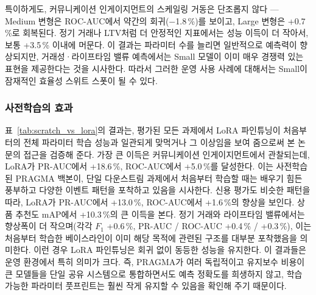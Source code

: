 특이하게도, 커뮤니케이션 인게이지먼트의 스케일링 거동은 단조롭지 않다 — Medium 변형은 ROC-AUC에서 약간의 회귀($-$1.8\,\%)를 보이고, Large 변형은 +0.7\,\%로 회복된다.
정기 거래나 LTV처럼 더 안정적인 지표에서는 성능 이득이 더 작아서, 보통 +3.5\,\% 이내에 머문다.
이 결과는 파라미터 수를 늘리면 일반적으로 예측력이 향상되지만, 거래성·라이프타임 밸류 예측에서는 Small 모델이 이미 매우 경쟁력 있는 표현을 제공한다는 것을 시사한다. 따라서 그러한 운영 사용 사례에 대해서는 Small이 잠재적인 효율성 스위트 스폿이 될 수 있다.


\subsubsection{사전학습의 효과}
\label{sec:pretraining_effect}

표~\ref{tab:scratch_vs_lora}의 결과는, 평가된 모든 과제에서 LoRA 파인튜닝이 처음부터의 전체 파라미터 학습 성능과 일관되게 맞먹거나 그 이상임을 보여 줌으로써 본 논문의 접근을 검증해 준다.
가장 큰 이득은 커뮤니케이션 인게이지먼트에서 관찰되는데, LoRA가 PR-AUC에서 +18.6\,\%, ROC-AUC에서 +5.0\,\%를 달성한다. 이는 사전학습된 PRAGMA 백본이, 단일 다운스트림 과제에서 처음부터 학습할 때는 배우기 힘든 풍부하고 다양한 이벤트 패턴을 포착하고 있음을 시사한다.
신용 평가도 비슷한 패턴을 따라, LoRA가 PR-AUC에서 +13.0\,\%, ROC-AUC에서 +1.6\,\%의 향상을 보인다.
상품 추천도 mAP에서 +10.3\,\%의 큰 이득을 본다.
정기 거래와 라이프타임 밸류에서는 향상폭이 더 작으며(각각 $F_1$ +0.6\,\%, PR-AUC / ROC-AUC +0.4\,\% / +0.3\,\%), 이는 처음부터 학습한 베이스라인이 이미 해당 목적에 관련된 구조를 대부분 포착했음을 의미한다. 이런 경우 LoRA 파인튜닝은 회귀 없이 동등한 성능을 유지한다.
이 결과들은 운영 환경에서 특히 의미가 크다. 즉, PRAGMA가 여러 독립적이고 유지보수 비용이 큰 모델들을 단일 공유 시스템으로 통합하면서도 예측 정확도를 희생하지 않고, 학습 가능한 파라미터 풋프린트는 훨씬 작게 유지할 수 있음을 확인해 주기 때문이다.

